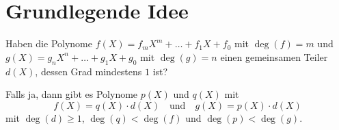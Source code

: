 %
%
%
%
\section{Grundlegende Idee
\label{resultante:section:Idee}}
Haben die Polynome \(f(X)=f_mX^m+\dots+f_1X+f_0\) mit \(\deg(f)=m\)
und \(g(X)=g_nX^n+\dots+g_1X+g_0\) mit \(\deg(g)=n\) einen gemeinsamen
Teiler \(d(X)\), dessen Grad mindestens \(1\) ist?

\noindent
Falls ja, dann gibt es Polynome \(p(X)\) und \(q(X)\) mit
\begin{equation}
    f(X)=q(X)\cdot d(X)\quad \text{und} \quad
    g(X)=p(X)\cdot d(X)
    \label{resultante:equation:divisor}
\end{equation}
mit \(\deg (d) \geq 1\), \(\deg(q)<\deg(f)\) und \(\deg(p)<\deg(g)\).

